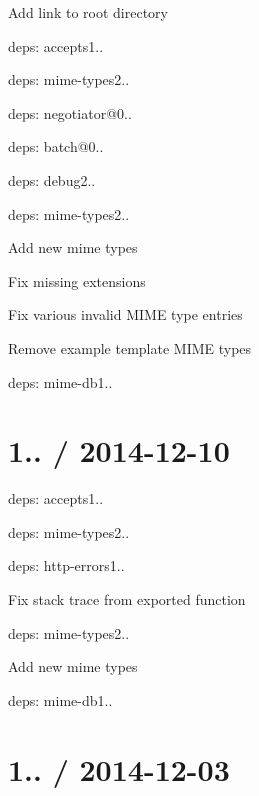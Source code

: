\begin{DoxyItemize}
\item Add link to root directory
\item deps\+: accepts1..
\begin{DoxyItemize}
\item deps\+: mime-\/types2..
\item deps\+: negotiator@0..
\end{DoxyItemize}
\item deps\+: batch@0..
\item deps\+: debug2..
\item deps\+: mime-\/types2..
\begin{DoxyItemize}
\item Add new mime types
\item Fix missing extensions
\item Fix various invalid M\+I\+ME type entries
\item Remove example template M\+I\+ME types
\item deps\+: mime-\/db1..
\end{DoxyItemize}
\end{DoxyItemize}

\section*{1.. / 2014-\/12-\/10 }


\begin{DoxyItemize}
\item deps\+: accepts1..
\begin{DoxyItemize}
\item deps\+: mime-\/types2..
\end{DoxyItemize}
\item deps\+: http-\/errors1..
\begin{DoxyItemize}
\item Fix stack trace from exported function
\end{DoxyItemize}
\item deps\+: mime-\/types2..
\begin{DoxyItemize}
\item Add new mime types
\item deps\+: mime-\/db1..
\end{DoxyItemize}
\end{DoxyItemize}

\section*{1.. / 2014-\/12-\/03 }


